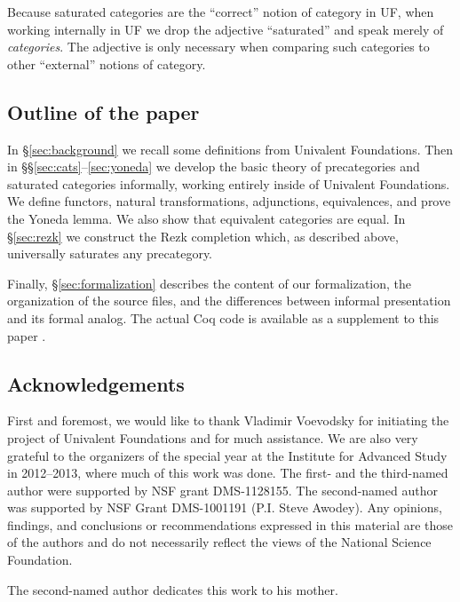 \documentclass{amsart}
\theoremstyle{definition}
\theoremstyle{remark}
\numberwithin{equation}{section}
\begin{document}
\begin{rmk}
  Because saturated categories are the ``correct'' notion of category in UF, when working internally in UF we drop the adjective ``saturated'' and speak merely of \emph{categories}.
  The adjective is only necessary when comparing such categories to other ``external'' notions of category.
\end{rmk}

\subsection*{Outline of the paper}

In \S\ref{sec:background} we recall some definitions from Univalent Foundations.
Then in \S\S\ref{sec:cats}--\ref{sec:yoneda} we develop the basic theory of precategories and saturated categories informally, working entirely inside of Univalent Foundations.
We define functors, natural transformations, adjunctions, equivalences, and prove the Yoneda lemma.
We also show that equivalent categories are equal.
In \S\ref{sec:rezk} we construct the Rezk completion which, as described above, universally saturates any precategory.

Finally, \S\ref{sec:formalization} describes the content of our formalization, the organization of the source files, and the differences between informal presentation and its formal analog.
The actual \textsf{Coq} code is available as a supplement to this paper \cite{rezk_coq}.





\subsection*{Acknowledgements}
First and foremost, we would like to thank Vladimir Voevodsky for initiating the project of Univalent Foundations and for much assistance.
We are also very grateful to the organizers of the special year at the Institute for Advanced Study in 2012--2013, where much of this work was done.
The first- and the third-named author were supported by NSF grant DMS-1128155.
The second-named author was supported by NSF Grant DMS-1001191 (P.I. Steve Awodey).
Any opinions, findings, and conclusions or recommendations expressed in this material are those of the authors and do not necessarily reflect the views of the National Science Foundation.

The second-named author dedicates this work to his mother.
\end{document}
